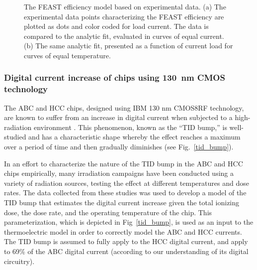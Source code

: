 \begin{figure}[ht]
\centering
{}
\caption{The FEAST efficiency model based on experimental data. (a) The experimental data points
characterizing the FEAST efficiency are plotted as dots and color coded for load current. The data is
compared to the analytic fit, evaluated in curves of equal current. (b) The same analytic fit,
presented as a function of current load for curves of equal temperature.
}
\label{fig:feast_eff}
\end{figure}


\subsubsection{Digital current increase of chips using 130~nm CMOS technology}

The ABC and HCC chips, designed using IBM 130 nm CMOS8RF technology, are known to suffer from an
increase in digital current when subjected to a high-radiation environment
\cite{Collaboration:2017mtb}. This phenomenon, known as the ``TID bump,'' is well-studied
\cite{1589217,FACCIO20081000} and has a characteristic shape whereby the effect reaches a maximum
over a period of time and then gradually diminishes (see Fig.~\ref{tid_bump}).

In an effort to characterize the nature of the TID bump in the ABC and HCC chips empirically,
many irradiation campaigns have been conducted using a variety of radiation sources, testing
the effect at different temperatures and dose rates.
The data collected from these studies was used to develop a model of the TID bump
that estimates the digital current increase given the total ionizing dose, the dose rate,
and the operating temperature of the chip. This parameterization, which is depicted in
Fig~\ref{tid_bump}, is used as an input to the thermoelectric model in order to correctly model the
ABC and HCC currents. The TID bump is assumed to fully apply to the HCC digital current, and apply to
69\% of the ABC digital current (according to our understanding of its digital circuitry).


